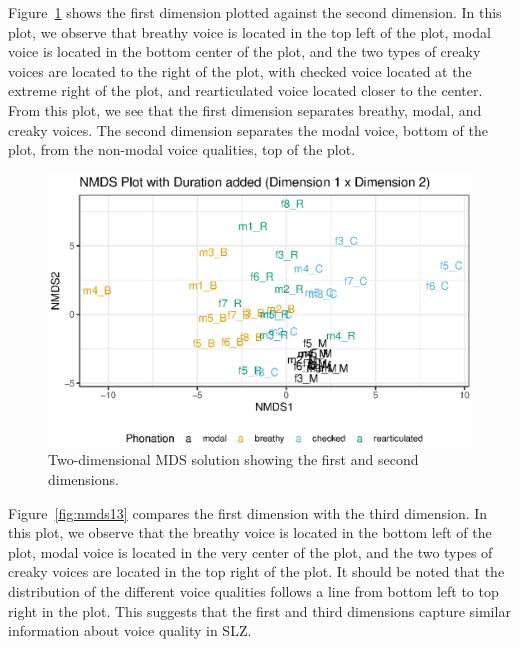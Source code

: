 Figure~\ref{fig:nmds12} shows the first dimension plotted against the second dimension. In this plot, we observe that breathy voice is located in the top left of the plot, modal voice is located in the bottom center of the plot, and the two types of creaky voices are located to the right of the plot, with checked voice located at the extreme right of the plot, and rearticulated voice located closer to the center. From this plot, we see that the first dimension separates breathy, modal, and creaky voices. The second dimension separates the modal voice, bottom of the plot, from the non-modal voice qualities, top of the plot.

\begin{figure}[h!]
    \centering
    \includegraphics[width = 0.75\linewidth]{images/MDS/nmds12_dur.eps}
    \caption{Two-dimensional MDS solution showing the first and second dimensions.}
    \label{fig:nmds12}
\end{figure}


Figure~\ref{fig:nmds13} compares the first dimension with the third dimension. In this plot, we observe that the breathy voice is located in the bottom left of the plot, modal voice is located in the very center of the plot, and the two types of creaky voices are located in the top right of the plot. It should be noted that the distribution of the different voice qualities follows a line from bottom left to top right in the plot. This suggests that the first and third dimensions capture similar information about voice quality in SLZ.

